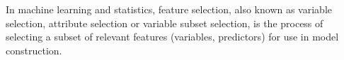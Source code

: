 

In machine learning and statistics, feature selection, also known as variable selection, attribute selection or variable subset selection, is the process of selecting a subset of relevant features (variables, predictors) for use in model construction.


